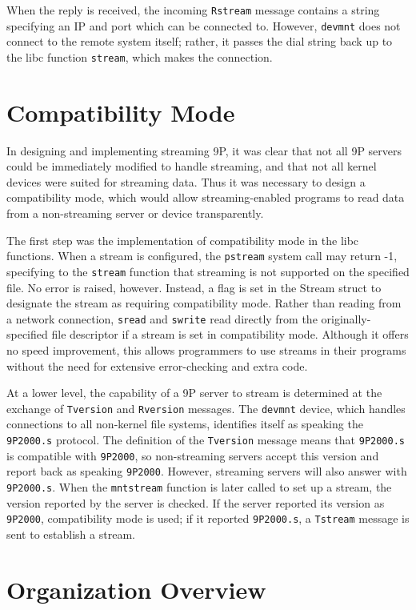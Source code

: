 \documentclass[11pt,american]{report}
\begin{document}
When the reply is received, the incoming {\tt Rstream} message contains a string specifying an IP and port which can be connected to. However, {\tt devmnt} does not connect to the remote system itself; rather, it passes the dial string back up to the libc function {\tt stream}, which makes the connection.

\section{Compatibility Mode}

In designing and implementing streaming 9P, it was clear that not all 9P servers could be immediately modified to handle streaming, and that not all kernel devices were suited for streaming data. Thus it was necessary to design a compatibility mode, which would allow streaming-enabled programs to read data from a non-streaming server or device transparently.

The first step was the implementation of compatibility mode in the libc functions. When a stream is configured, the {\tt pstream} system call may return -1, specifying to the {\tt stream} function that streaming is not supported on the specified file. No error is raised, however. Instead, a flag is set in the Stream struct to designate the stream as requiring compatibility mode. Rather than reading from a network connection, {\tt sread} and {\tt swrite} read directly from the originally-specified file descriptor if a stream is set in compatibility mode. Although it offers no speed improvement, this allows programmers to use streams in their programs without the need for extensive error-checking and extra code.

At a lower level, the capability of a 9P server to stream is determined at the exchange of {\tt Tversion} and {\tt Rversion} messages. The {\tt devmnt} device, which handles connections to all non-kernel file systems, identifies itself as speaking the {\tt 9P2000.s} protocol. The definition of the {\tt Tversion} message means that {\tt 9P2000.s} is compatible with {\tt 9P2000}, so non-streaming servers accept this version and report back as speaking {\tt 9P2000}. However, streaming servers will also answer with {\tt 9P2000.s}. When the {\tt mntstream} function is later called to set up a stream, the version reported by the server is checked. If the server reported its version as {\tt 9P2000}, compatibility mode is used; if it reported {\tt 9P2000.s}, a {\tt Tstream} message is sent to establish a stream.

\section{Organization Overview}
\end{document}
